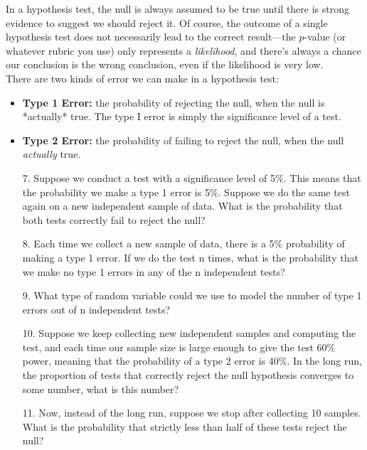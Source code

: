 \documentclass[10pt]{extarticle}
\begin{document}
\hfill  

In a hypothesis test, the null is always assumed to be true until there is strong evidence to suggest we should reject it. Of course, the outcome of a single hypothesis test does not necessarily lead to the correct result---the $p$-value (or whatever rubric you use) only represents a {\it likelihood}, and there's always a chance our conclusion is the wrong conclusion, even if the likelihood is very low.  \\  

There are two kinds of error we can make in a hypothesis test:  

\begin{itemize}	
	\item {\bf Type 1 Error:} the probability of rejecting the null, when the null is *actually* true. The type I error is simply the significance level of a test.  
	\item {\bf Type 2 Error:} the probability of failing to reject the null, when the null {\it actually} true. 
\end{itemize} 

\hfill 

\begin{itemize}

	\item[7.] Suppose we conduct a test with a significance level of 5\%. This means that the probability we make a type 1 error  is 5\%. Suppose we do  the same  test again on a new independent sample of data. What is the probability that both tests correctly fail to reject the null? \\ 

	\item[8.] Each time we collect a new sample of data, there is a 5\% probability of making a type 1 error. If we do the test n times, what is the probability that we make no type 1 errors in any of the n independent tests? \\ 

	\item[9.] What type of random variable could we use to model the number of type 1 errors out of n independent tests? \\ 

	\item[10.] Suppose we keep collecting new independent samples and computing the test, and each time our sample size is large enough to give the test 60\% power, meaning that the probability of a type 2 error is 40\%. In the long run, the proportion of tests that correctly reject the null hypothesis converges to some number, what is this number? \\ 

	\item[11.] Now, instead of the long run, suppose we stop after collecting 10 samples. What is the probability that strictly less than half of these tests reject the null? \\ 

\end{itemize}
\end{document}
